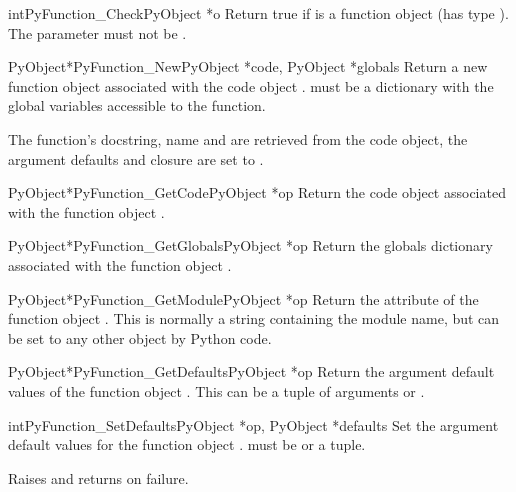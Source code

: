 \begin{cfuncdesc}{int}{PyFunction_Check}{PyObject *o}
  Return true if  is a function object (has type
  ).  The parameter must not be \NULL{}.
\end{cfuncdesc}

\begin{cfuncdesc}{PyObject*}{PyFunction_New}{PyObject *code,
                                             PyObject *globals}
  Return a new function object associated with the code object
  .  must be a dictionary with the global
  variables accessible to the function.

  The function's docstring, name and  are retrieved
  from the code object, the argument defaults and closure are set to
  \NULL{}.
\end{cfuncdesc}

\begin{cfuncdesc}{PyObject*}{PyFunction_GetCode}{PyObject *op}
  Return the code object associated with the function object .
\end{cfuncdesc}

\begin{cfuncdesc}{PyObject*}{PyFunction_GetGlobals}{PyObject *op}
  Return the globals dictionary associated with the function object
  .
\end{cfuncdesc}

\begin{cfuncdesc}{PyObject*}{PyFunction_GetModule}{PyObject *op}
  Return the  attribute of the function object .
  This is normally a string containing the module name, but can be set
  to any other object by Python code.
\end{cfuncdesc}

\begin{cfuncdesc}{PyObject*}{PyFunction_GetDefaults}{PyObject *op}
  Return the argument default values of the function object .
  This can be a tuple of arguments or \NULL{}.
\end{cfuncdesc}

\begin{cfuncdesc}{int}{PyFunction_SetDefaults}{PyObject *op,
                                               PyObject *defaults}
  Set the argument default values for the function object .
   must be  or a tuple.

  Raises  and returns  on failure.
\end{cfuncdesc}

